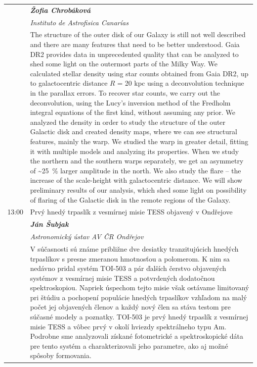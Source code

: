 \documentclass[a4paper]{report}
\begin{document}
\begin{tabularx}{\textwidth}{>{}p{2cm} >{\RaggedRight}X}
                                            & \textit{\textbf{Žofia Chrobáková}} \\
                                                                & \textit{Instituto de Astrofisica Canarías} \\
                                                                & The structure of the outer disk of our Galaxy is still not well described and there are many features that need to be better understood. Gaia DR2 provides data in unprecedented quality that can be analyzed to shed some light on the outermost parts of the Milky Way. We calculated stellar density using star counts obtained from Gaia DR2, up to galactocentric distance $R$ = 20 kpc using a deconvolution technique in the parallax errors. To recover star counts, we carry out the deconvolution, using the Lucy's inversion method of the Fredholm integral equations of the first kind, without assuming any prior. We analyzed the density in order to study the structure of the outer Galactic disk and created density maps, where we can see structural features, mainly the warp. We studied the warp in greater detail, fitting it with multiple models and analyzing its properties. When we study the northern and the southern warps separately, we get an asymmetry of \textasciitilde\SI{25}{\percent} larger amplitude in the north. We also study the flare -- the increase of the scale-height with galactocentric distance. We will show preliminary results of our analysis, which shed some light on possibility of flaring of the Galactic disk in the remote regions of the Galaxy.
 \\
                                        \midrule                            {\Large 13:00} & {\Large Prvý hnedý trpaslík z vesmírnej misie TESS objavený v Ondřejove} \\
                                            & \textit{\textbf{Ján Šubjak}} \\
                                                                & \textit{Astronomický ústav AV ČR Ondřejov} \\
                                                                & V súčasnosti sú známe približne dve desiatky tranzitujúcich hnedých trpaslíkov s presne zmeranou hmotnosťou a polomerom. K nim sa nedávno pridal systém TOI-503 a pár ďalších čerstvo objavených systémov z vesmírnej misie TESS a potvrdených dodatočnou spektroskopiou. Napriek úspechom tejto misie však ostávame limitovaný pri štúdiu a pochopení populácie hnedých trpaslíkov vzhľadom na malý počet jej objavených členov a každý nový člen sa stáva testom pre súčasné modely a poznatky. TOI-503 je prvý hnedý trpaslík z vesmírnej misie TESS a vôbec prvý v okolí hviezdy spektrálneho typu Am. Podrobne sme analyzovali získané fotometrické a spektroskopické dáta pre tento systém a charakterizovali jeho parametre, ako aj možné spôsoby formovania.

\end{tabularx}
\end{document}

